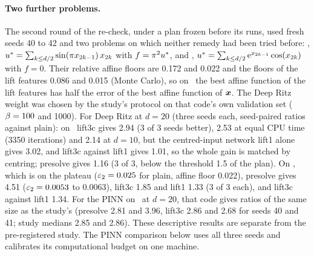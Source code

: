 \paragraph{Two further problems.} The second round of the re-check, under a plan frozen before its
runs, used fresh seeds 40 to 42 and two problems on which neither remedy had been tried before:
\Psinlin, $u^{*}=\sum_{k\le d/2}\sin(\pi x_{2k-1})\,x_{2k}$ with $f=\pi^2u^{*}$, and
\Pexpcos, $u^{*}=\sum_{k\le d/2}\mathrm{e}^{x_{2k-1}}\cos(x_{2k})$ with $f=0$. Their relative affine
floors are 0.172 and 0.022 and the floors of the lift features 0.086 and 0.015 (Monte Carlo), so
on \Psinlin\ the best affine function of the lift features has half the error of the best affine
function of $\boldsymbol{x}$. The Deep Ritz weight was chosen by the study's protocol on that code's own
validation set ($\beta=100$ and 1000).
For Deep Ritz at $d=20$ (three seeds each, seed-paired ratios against plain): on \Psinlin\ lift3c
gives 2.94 (3 of 3 seeds better), 2.53 at equal CPU time (3350 iterations) and 2.14 at $d=10$, but
the centred-input network lift1 alone gives 3.02, and lift3c against lift1 gives 1.01, so the whole
gain is matched by centring; presolve gives 1.16 (3 of 3, below the threshold 1.5 of the plan). On
\Pexpcos, which is on the plateau ($\varepsilon_{2}=0.025$ for plain, affine floor 0.022), presolve gives
4.51 ($\varepsilon_{2}=0.0053$ to $0.0063$), lift3c 1.85 and lift1 1.33 (3 of 3 each), and lift3c against
lift1 1.34. For the PINN on \Pone\ at $d=20$, that code gives ratios of the same size as the study's
(presolve 2.81 and 3.96, lift3c 2.86 and 2.68 for seeds 40 and 41; study medians 2.85 and 2.86).
These descriptive results are separate from the pre-registered study. The PINN comparison below
uses all three seeds and calibrates its computational budget on one machine.

